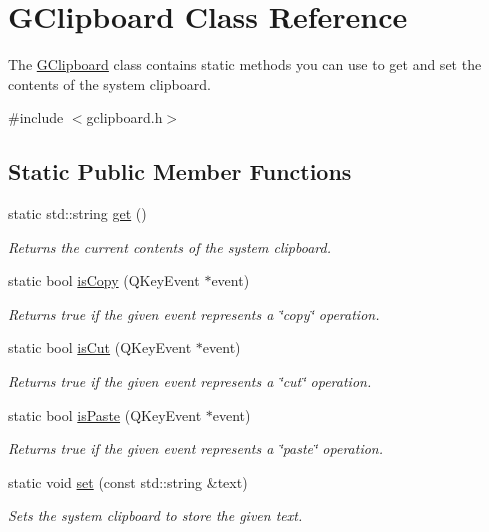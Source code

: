 \hypertarget{classsgl_1_1GClipboard}{}\section{G\+Clipboard Class Reference}
\label{classsgl_1_1GClipboard}


The \mbox{\hyperlink{classsgl_1_1GClipboard}{G\+Clipboard}} class contains static methods you can use to get and set the contents of the system clipboard.  




{\ttfamily \#include $<$gclipboard.\+h$>$}

\subsection*{Static Public Member Functions}
\begin{DoxyCompactItemize}
\item 
static std\+::string \mbox{\hyperlink{classsgl_1_1GClipboard_a4879b26a87a0b49f7d535c7a669620f6}{get}} ()
\begin{DoxyCompactList}\small\item\em Returns the current contents of the system clipboard. \end{DoxyCompactList}\item 
static bool \mbox{\hyperlink{classsgl_1_1GClipboard_a813cbc957e264a1846175ece316757d3}{is\+Copy}} (Q\+Key\+Event $\ast$event)
\begin{DoxyCompactList}\small\item\em Returns true if the given event represents a \char`\"{}copy\char`\"{} operation. \end{DoxyCompactList}\item 
static bool \mbox{\hyperlink{classsgl_1_1GClipboard_a5ea46b856cb8eae1295b1e2b7db664aa}{is\+Cut}} (Q\+Key\+Event $\ast$event)
\begin{DoxyCompactList}\small\item\em Returns true if the given event represents a \char`\"{}cut\char`\"{} operation. \end{DoxyCompactList}\item 
static bool \mbox{\hyperlink{classsgl_1_1GClipboard_a26e3ab35c80c96117dd4bb455cf38c82}{is\+Paste}} (Q\+Key\+Event $\ast$event)
\begin{DoxyCompactList}\small\item\em Returns true if the given event represents a \char`\"{}paste\char`\"{} operation. \end{DoxyCompactList}\item 
static void \mbox{\hyperlink{classsgl_1_1GClipboard_a59ad3e94e40e8ef08c8a69a3a67377df}{set}} (const std\+::string \&text)
\begin{DoxyCompactList}\small\item\em Sets the system clipboard to store the given text. \end{DoxyCompactList}\end{DoxyCompactItemize}


